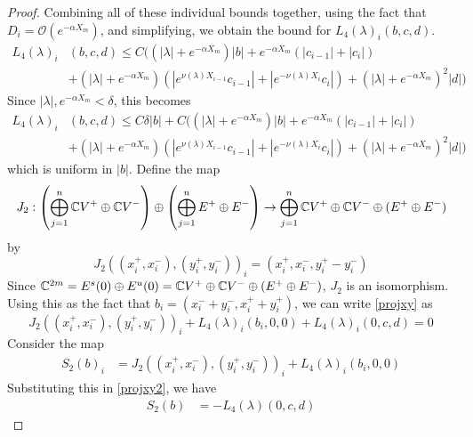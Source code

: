 \documentclass[thesis.tex]{subfiles}
\begin{document}
\begin{lemma}
\begin{proof}
Combining all of these individual bounds together, using the fact that $D_i = \mathcal{O}(e^{-\alpha X_m})$, and simplifying, we obtain the bound for $L_4(\lambda)_i(b, c, d)$.
\begin{align*}
L_4(\lambda)_i&(b, c, d) \leq 
C\Big( (|\lambda| + e^{-\alpha X_m})|b|  
+ e^{-\alpha X_m}(|c_{i-1}| + |c_i|) \\
&+ (|\lambda| + e^{-\alpha X_m})(|e^{\nu(\lambda)X_{i-1}} c_{i-1}| + |e^{-\nu(\lambda)X_i} c_i|) + (|\lambda| + e^{-\alpha X_m})^2 |d|  \Big) 
\end{align*}
Since $|\lambda|, e^{-\alpha X_m} < \delta$, this becomes
\begin{align*}
L_4(\lambda)_i&(b, c, d) \leq 
C \delta |b| + C \Big( (|\lambda| + e^{-\alpha X_m})|b|  
+ e^{-\alpha X_m}(|c_{i-1}| + |c_i|) \\
&+ (|\lambda| + e^{-\alpha X_m})(|e^{\nu(\lambda)X_{i-1}} c_{i-1}| + |e^{-\nu(\lambda)X_i} c_i|) + (|\lambda| + e^{-\alpha X_m})^2 |d|  \Big) 
\end{align*}
which is uniform in $|b|$. Define the map
\[
J_2: \left( \bigoplus_{j=1}^n \mathbb{C} V^+ \oplus \mathbb{C} V^- \right) \oplus
\left( \bigoplus_{j=1}^n E^+ \oplus E^- \right) 
\rightarrow \bigoplus_{j=1}^n \mathbb{C} V^+ \oplus \mathbb{C} V^- \oplus (E^+ \oplus E^-)
\]
by 
\[
J_2( (x_i^+, x_i^-),(y_i^+, y_i^-))_i = ( x_i^+, x_i^-, y_i^+ - y_i^- )
\]
Since $\mathbb{C}^{2m} = E^s(0) \oplus E^u(0) = \mathbb{C} V^+ \oplus \mathbb{C} V^- \oplus (E^+ \oplus E^-)$, $J_2$ is an isomorphism. Using this as the fact that $b_i = (x_i^- + y_i^-, x_i^+ + y_i^+)$, we can write \eqref{projxy} as
\begin{equation}\label{projxy2}
J_2( (x_i^+, x_i^-),(y_i^+, y_i^-))_i 
+ L_4(\lambda)_i(b_i, 0, 0) + L_4(\lambda)_i(0, c, d) = 0
\end{equation}
Consider the map
\begin{align*}
S_2(b)_i &= J_2( (x_i^+, x_i^-),(y_i^+, y_i^-))_i 
+ L_4(\lambda)_i(b_i, 0, 0) 
\end{align*}
Substituting this in \eqref{projxy2}, we have
\begin{align*}
S_2(b) &= -L_4(\lambda)(0, c, d)
\end{align*}


\end{proof}
\end{lemma}
\end{document}
